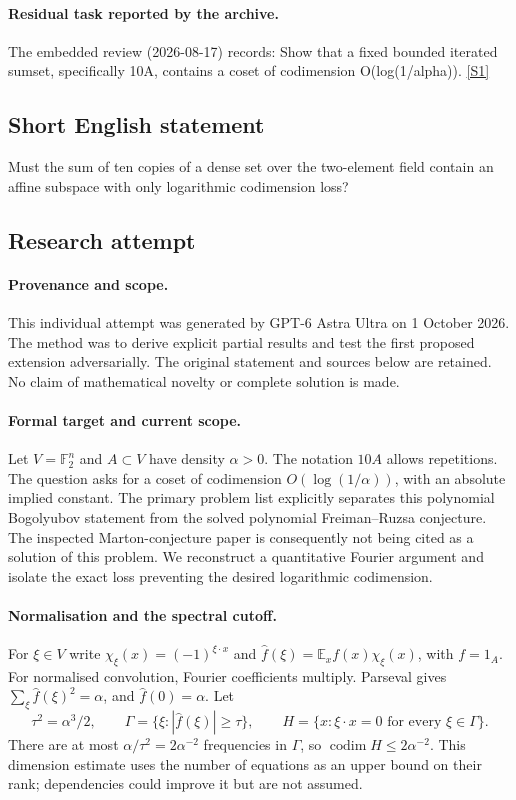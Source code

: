 \documentclass[11pt,a4paper]{article}
\newcommand{\F}{\mathbb{F}}
\newcommand{\E}{\mathbb{E}}
\newcommand{\sref}[2]{\hyperlink{source:#1:#2}{[S#2]}}
\begin{document}
\paragraph{Residual task reported by the archive.}

The embedded review (2026-08-17) records: Show that a fixed bounded iterated sumset, specifically 10A, contains a coset of codimension O(log(1/alpha)). \sref{111}{1}

\subsection{Short English statement}

Must the sum of ten copies of a dense set over the two-element field contain an affine subspace with only logarithmic codimension loss?

\subsection{Research attempt}

\paragraph{Provenance and scope.}
This individual attempt was generated by GPT-6 Astra Ultra on 1 October 2026. The method was to derive explicit partial results and test the first proposed extension adversarially. The original statement and sources below are retained. No claim of mathematical novelty or complete solution is made.

\paragraph{Formal target and current scope.}
Let $V=\F_2^n$ and $A\subset V$ have density $\alpha>0$. The notation $10A$ allows repetitions. The question asks for a coset of codimension $O(\log(1/\alpha))$, with an absolute implied constant. The primary problem list explicitly separates this polynomial Bogolyubov statement from the solved polynomial Freiman--Ruzsa conjecture. The inspected Marton-conjecture paper is consequently not being cited as a solution of this problem. We reconstruct a quantitative Fourier argument and isolate the exact loss preventing the desired logarithmic codimension.

\paragraph{Normalisation and the spectral cutoff.}
For $\xi\in V$ write $\chi_\xi(x)=(-1)^{\xi\cdot x}$ and $\widehat f(\xi)=\E_xf(x)\chi_\xi(x)$, with $f=1_A$. For normalised convolution, Fourier coefficients multiply. Parseval gives $\sum_\xi\widehat f(\xi)^2=\alpha$, and $\widehat f(0)=\alpha$. Let
\[
 \tau^2=\alpha^3/2,\qquad
 \Gamma=\{\xi:|\widehat f(\xi)|\geq\tau\},\qquad
 H=\{x:\xi\cdot x=0\text{ for every }\xi\in\Gamma\}.
\]
There are at most $\alpha/\tau^2=2\alpha^{-2}$ frequencies in $\Gamma$, so $\operatorname{codim}H\leq2\alpha^{-2}$. This dimension estimate uses the number of equations as an upper bound on their rank; dependencies could improve it but are not assumed.
\end{document}
